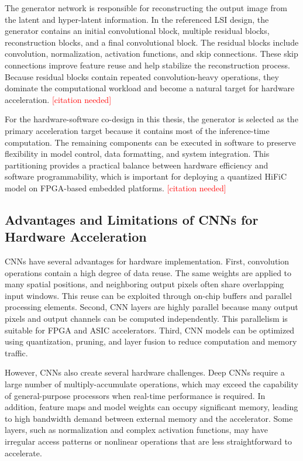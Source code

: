 \documentclass[11pt]{report}
\begin{document}
The generator network is responsible for reconstructing the output image from the latent and hyper-latent information. In the referenced LSI design, the generator contains an initial convolutional block, multiple residual blocks, reconstruction blocks, and a final convolutional block. The residual blocks include convolution, normalization, activation functions, and skip connections. These skip connections improve feature reuse and help stabilize the reconstruction process. Because residual blocks contain repeated convolution-heavy operations, they dominate the computational workload and become a natural target for hardware acceleration. \textcolor{red}{[citation needed]}

For the hardware-software co-design in this thesis, the generator is selected as the primary acceleration target because it contains most of the inference-time computation. The remaining components can be executed in software to preserve flexibility in model control, data formatting, and system integration. This partitioning provides a practical balance between hardware efficiency and software programmability, which is important for deploying a quantized HiFiC model on FPGA-based embedded platforms. \textcolor{red}{[citation needed]}

\subsection{Advantages and Limitations of CNNs for Hardware Acceleration}

CNNs have several advantages for hardware implementation. First, convolution operations contain a high degree of data reuse. The same weights are applied to many spatial positions, and neighboring output pixels often share overlapping input windows. This reuse can be exploited through on-chip buffers and parallel processing elements. Second, CNN layers are highly parallel because many output pixels and output channels can be computed independently. This parallelism is suitable for FPGA and ASIC accelerators. Third, CNN models can be optimized using quantization, pruning, and layer fusion to reduce computation and memory traffic.

However, CNNs also create several hardware challenges. Deep CNNs require a large number of multiply-accumulate operations, which may exceed the capability of general-purpose processors when real-time performance is required. In addition, feature maps and model weights can occupy significant memory, leading to high bandwidth demand between external memory and the accelerator. Some layers, such as normalization and complex activation functions, may have irregular access patterns or nonlinear operations that are less straightforward to accelerate.
\end{document}
